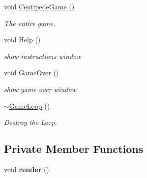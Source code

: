 \begin{DoxyCompactItemize}
void \mbox{\hyperlink{class_game_loop_a3afbb7d2141730850d4ef637f314d4d9}{Centipede\+Game}} ()
\begin{DoxyCompactList}\small\item\em The entire game. \end{DoxyCompactList}\item 
\mbox{\label{class_game_loop_a62170939aeed0f49b7708e11db9539e2}} 
void \mbox{\hyperlink{class_game_loop_a62170939aeed0f49b7708e11db9539e2}{Help}} ()
\begin{DoxyCompactList}\small\item\em show instructions window \end{DoxyCompactList}\item 
\mbox{\label{class_game_loop_a741d6e0139d5a21247402ac77fe953cf}} 
void \mbox{\hyperlink{class_game_loop_a741d6e0139d5a21247402ac77fe953cf}{Game\+Over}} ()
\begin{DoxyCompactList}\small\item\em show game over window \end{DoxyCompactList}\item 
\mbox{\label{class_game_loop_ae6c558d0d751a068dbafe2cae465ec1f}} 
\mbox{\hyperlink{class_game_loop_ae6c558d0d751a068dbafe2cae465ec1f}{$\sim$\+Game\+Loop}} ()
\begin{DoxyCompactList}\small\item\em Destroy the Loop. \end{DoxyCompactList}\end{DoxyCompactItemize}
\subsection*{Private Member Functions}
\begin{DoxyCompactItemize}
\item 
\mbox{\label{class_game_loop_acf569cf445d5bfeffca7784501097ca5}} 
void {\bfseries render} ()
\end{DoxyCompactItemize}
